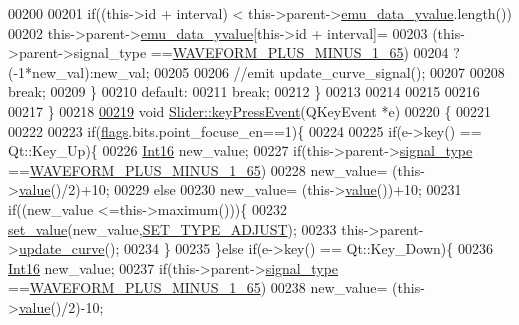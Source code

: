 \begin{DoxyCode}
00200 
00201         \textcolor{keywordflow}{if}((this->\textcolor{keywordtype}{id} + interval) < this->parent->\hyperlink{a00008_ad922d05d1e988d84f404c115fe909f72}{emu\_data\_yvalue}.length())
00202         this->parent->\hyperlink{a00008_ad922d05d1e988d84f404c115fe909f72}{emu\_data\_yvalue}[this->id + interval]=
00203         (this->parent->signal\_type ==\hyperlink{a00090_a0923d3b365a36e1e8c401cec964aa36f}{WAVEFORM\_PLUS\_MINUS\_1\_65})
00204         ?(-1*new\_val):new\_val;
00205 
00206         \textcolor{comment}{//emit update\_curve\_signal();}
00207 
00208     \textcolor{keywordflow}{break};
00209     \}
00210     \textcolor{keywordflow}{default}:
00211         \textcolor{keywordflow}{break};
00212     \}
00213 
00214 
00215 
00216 
00217 \}
00218 
\hypertarget{a00133_source_l00219}{}\hyperlink{a00077_ab803f71d290c06c574e6d46be42e779e}{00219} \textcolor{keywordtype}{void} \hyperlink{a00077_ab803f71d290c06c574e6d46be42e779e}{Slider::keyPressEvent}(QKeyEvent *e)
00220 \{
00221 
00222 
00223     \textcolor{keywordflow}{if}(\hyperlink{a00077_ade6449558d429b66e5ed1381bc9b9060}{flags}.bits.point\_focuse\_en==1)\{
00224 
00225     \textcolor{keywordflow}{if}(e->key() == Qt::Key\_Up)\{
00226         \hyperlink{a00004_a3985266aecb120f269789241c170850c}{Int16} new\_value;
00227         \textcolor{keywordflow}{if}(this->parent->\hyperlink{a00008_a070edaec5aee6ba1f5a6866bc32c8ce4}{signal\_type} ==\hyperlink{a00090_a0923d3b365a36e1e8c401cec964aa36f}{WAVEFORM\_PLUS\_MINUS\_1\_65})
00228         new\_value= (this->\hyperlink{a00116_aee90379adb0307effb138f4871edbc5c}{value}()/2)+10;
00229         \textcolor{keywordflow}{else}
00230         new\_value= (this->\hyperlink{a00116_aee90379adb0307effb138f4871edbc5c}{value}())+10;
00231         \textcolor{keywordflow}{if}((new\_value <=this->maximum()))\{
00232             \hyperlink{a00077_ae3010d3de02715db2f443560d7d2a27b}{set\_value}(new\_value,\hyperlink{a00090_a16b6b7b5ad68ec0dd62a3c9e97f88adb}{SET\_TYPE\_ADJUST});
00233             this->parent->\hyperlink{a00008_a15cbcf5f0a17281468800f47898f60c1}{update\_curve}();
00234         \}
00235     \}\textcolor{keywordflow}{else} \textcolor{keywordflow}{if}(e->key() == Qt::Key\_Down)\{
00236         \hyperlink{a00004_a3985266aecb120f269789241c170850c}{Int16} new\_value;
00237         \textcolor{keywordflow}{if}(this->parent->\hyperlink{a00008_a070edaec5aee6ba1f5a6866bc32c8ce4}{signal\_type} ==\hyperlink{a00090_a0923d3b365a36e1e8c401cec964aa36f}{WAVEFORM\_PLUS\_MINUS\_1\_65})
00238         new\_value= (this->\hyperlink{a00116_aee90379adb0307effb138f4871edbc5c}{value}()/2)-10;

\end{DoxyCode}
